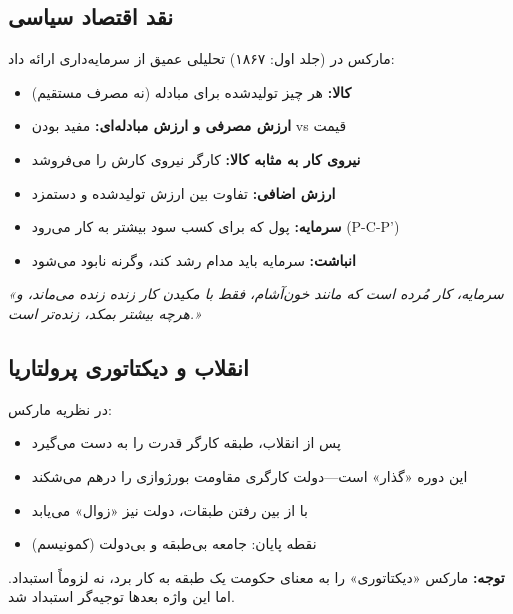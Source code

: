 \subsection{نقد اقتصاد سیاسی}

مارکس در  (جلد اول: ۱۸۶۷) تحلیلی عمیق از سرمایه‌داری ارائه داد:

\begin{defbox}
\begin{itemize}[nosep]
    \item \textbf{کالا:} هر چیز تولیدشده برای مبادله (نه مصرف مستقیم)
    \item \textbf{ارزش مصرفی و ارزش مبادله‌ای:} مفید بودن vs قیمت
    \item \textbf{نیروی کار به مثابه کالا:} کارگر نیروی کارش را می‌فروشد
    \item \textbf{ارزش اضافی:} تفاوت بین ارزش تولیدشده و دستمزد
    \item \textbf{سرمایه:} پول که برای کسب سود بیشتر به کار می‌رود (P-C-P')
    \item \textbf{انباشت:} سرمایه باید مدام رشد کند، وگرنه نابود می‌شود
\end{itemize}
\end{defbox}

\begin{quotebox}
\textit{«سرمایه، کار مُرده است که مانند خون‌آشام، فقط با مکیدن کار زنده زنده می‌ماند، و هرچه بیشتر بمکد، زنده‌تر است.»}
\end{quotebox}

\subsection{انقلاب و دیکتاتوری پرولتاریا}

\begin{defbox}
در نظریه مارکس:
\begin{itemize}[nosep]
    \item پس از انقلاب، طبقه کارگر قدرت را به دست می‌گیرد
    \item این دوره «گذار» است—دولت کارگری مقاومت بورژوازی را درهم می‌شکند
    \item با از بین رفتن طبقات، دولت نیز «زوال» می‌یابد
    \item نقطه پایان: جامعه بی‌طبقه و بی‌دولت (کمونیسم)
\end{itemize}
\textbf{توجه:} مارکس «دیکتاتوری» را به معنای حکومت یک طبقه به کار برد، نه لزوماً استبداد. اما این واژه بعدها توجیه‌گر استبداد شد.
\end{defbox}

